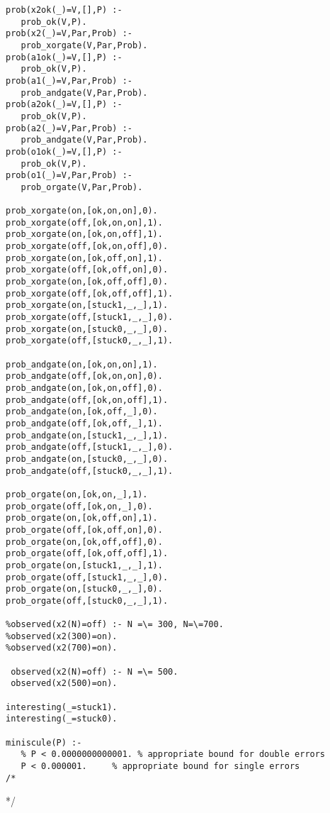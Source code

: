 \begin{verbatim}
prob(x2ok(_)=V,[],P) :-
   prob_ok(V,P).
prob(x2(_)=V,Par,Prob) :-
   prob_xorgate(V,Par,Prob).
prob(a1ok(_)=V,[],P) :-
   prob_ok(V,P).
prob(a1(_)=V,Par,Prob) :-
   prob_andgate(V,Par,Prob).
prob(a2ok(_)=V,[],P) :-
   prob_ok(V,P).
prob(a2(_)=V,Par,Prob) :-
   prob_andgate(V,Par,Prob).
prob(o1ok(_)=V,[],P) :-
   prob_ok(V,P).
prob(o1(_)=V,Par,Prob) :-
   prob_orgate(V,Par,Prob).

prob_xorgate(on,[ok,on,on],0).
prob_xorgate(off,[ok,on,on],1).
prob_xorgate(on,[ok,on,off],1).
prob_xorgate(off,[ok,on,off],0).
prob_xorgate(on,[ok,off,on],1).
prob_xorgate(off,[ok,off,on],0).
prob_xorgate(on,[ok,off,off],0).
prob_xorgate(off,[ok,off,off],1).
prob_xorgate(on,[stuck1,_,_],1).
prob_xorgate(off,[stuck1,_,_],0).
prob_xorgate(on,[stuck0,_,_],0).
prob_xorgate(off,[stuck0,_,_],1).

prob_andgate(on,[ok,on,on],1).
prob_andgate(off,[ok,on,on],0).
prob_andgate(on,[ok,on,off],0).
prob_andgate(off,[ok,on,off],1).
prob_andgate(on,[ok,off,_],0).
prob_andgate(off,[ok,off,_],1).
prob_andgate(on,[stuck1,_,_],1).
prob_andgate(off,[stuck1,_,_],0).
prob_andgate(on,[stuck0,_,_],0).
prob_andgate(off,[stuck0,_,_],1).

prob_orgate(on,[ok,on,_],1).
prob_orgate(off,[ok,on,_],0).
prob_orgate(on,[ok,off,on],1).
prob_orgate(off,[ok,off,on],0).
prob_orgate(on,[ok,off,off],0).
prob_orgate(off,[ok,off,off],1).
prob_orgate(on,[stuck1,_,_],1).
prob_orgate(off,[stuck1,_,_],0).
prob_orgate(on,[stuck0,_,_],0).
prob_orgate(off,[stuck0,_,_],1).

%observed(x2(N)=off) :- N =\= 300, N=\=700.
%observed(x2(300)=on).
%observed(x2(700)=on).

 observed(x2(N)=off) :- N =\= 500.
 observed(x2(500)=on).

interesting(_=stuck1).
interesting(_=stuck0).

miniscule(P) :- 
   % P < 0.0000000000001. % appropriate bound for double errors
   P < 0.000001.     % appropriate bound for single errors
/* \end{verbatim} 
*/
